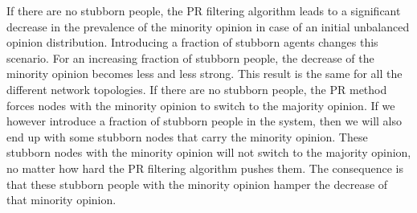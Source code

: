 \documentclass[11 pt , letterpaper , twoside , openright]{book}
\begin{document}
If there are no stubborn people, the PR filtering algorithm leads to a significant decrease in the prevalence of the minority opinion in case of an initial unbalanced opinion distribution. Introducing a fraction of stubborn agents changes this scenario. For an increasing fraction of stubborn people, the decrease of the minority opinion becomes less and less strong. This result is the same for all the different network topologies. If there are no stubborn people, the PR method forces nodes with the minority opinion to switch to the majority opinion. If we however introduce a fraction of stubborn people in the system, then we will also end up with some stubborn nodes that carry the minority opinion. These stubborn nodes with the minority opinion will not switch to the majority opinion, no matter how hard the PR filtering algorithm pushes them. The consequence is that these stubborn people with the minority opinion hamper the decrease of that minority opinion. 
\end{document}
